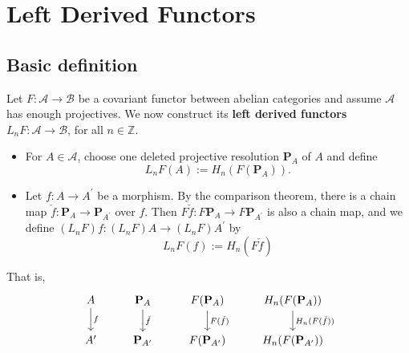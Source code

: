 \documentclass[12pt, oneside]{book}
\begin{document}
\section{Left Derived Functors} %
\subsection{Basic definition}
\begin{definition}
    Let $F: \mathcal{A} \rightarrow \mathcal{B}$ be a covariant functor between abelian categories and assume $\mathcal{A}$ has enough projectives.
    We now construct its \textbf{left derived functors} $L_n F: \mathcal{A} \rightarrow \mathcal{B}$, for all $n \in \mathbb{Z}$.
    \begin{itemize}
        \item
              For $A\in \mathcal{A}$, choose one deleted projective resolution $\mathbf{P}_A$ of $A$ and define
              \begin{equation*}
                  L_n F \left(A\right)
                  :=
                  H_n\left(F \left(\mathbf{P}_A\right)\right) .
              \end{equation*}
        \item
              Let $f: A \rightarrow A^{\prime}$ be a morphism. By the comparison theorem, there is a chain map $\check{f}: \mathbf{P}_A \rightarrow \mathbf{P}_{A^{\prime}}$ over $f$. Then $F \check{f}: F \mathbf{P}_A \rightarrow F \mathbf{P}_{A^{\prime}}$ is also a chain map, and we define $\left(L_n F\right) f:\left(L_n F\right) A \rightarrow\left(L_n F\right) A^{\prime}$ by
              \begin{equation*}
                  L_n F \left(f\right):=H_n(F \check{f})
              \end{equation*}
    \end{itemize}
    \begin{remark}
        That is,
        \begin{equation*}
            \begin{tikzcd}
                A   \arrow[d,"f"]     & \mathbf{P}_A \arrow[d,"\check{f}"]         & F(\mathbf{P}_A) \arrow[d,"F(\check{f})"]          & H_n (F(\mathbf{P}_A)) \arrow[d,"H_n(F(\check{f}))"]         \\
                A^\prime & \mathbf{P}_{A^\prime} & F(\mathbf{P}_{A^\prime}) & H_n (F(\mathbf{P}_{A^\prime}))
            \end{tikzcd}
        \end{equation*}
    \end{remark}
\end{definition}
\end{document}
